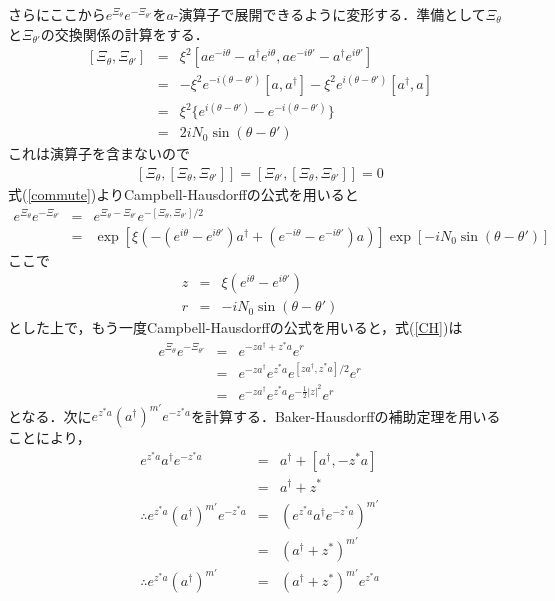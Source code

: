 \documentclass[10.5pt,a4paper]{jreport}
\begin{document}
さらにここから$e^{\Xi_\theta}e^{-\Xi_{\theta'} }$を$a$-演算子で展開できるように変形する．準備として$\Xi_\theta$と$\Xi_{\theta'}$の交換関係の計算をする．
\begin{eqnarray}
  \left[\Xi_\theta, \Xi_{\theta'}\right] &=& \xi^2\left[ae^{-i\theta} - a^\dagger e^{i\theta},ae^{-i\theta'}-a^\dagger e^{i\theta'}\right]\\
  &=&-\xi^2e^{-i(\theta-\theta')}[a,a^\dagger]-\xi^2e^{i(\theta-\theta')}[a^\dagger,a]\\
  &=&\xi^2\{e^{i(\theta-\theta')}-e^{-i(\theta-\theta')}\}\\
  &=&2iN_0\sin(\theta-\theta')
\end{eqnarray}
これは演算子を含まないので
\begin{eqnarray}
  \left[\Xi_\theta,[\Xi_\theta,\Xi_{\theta'}]\right] = \left[\Xi_{\theta'},[\Xi_\theta,\Xi_{\theta'}]\right] = 0\label{commute}
\end{eqnarray}
式(\ref{commute})よりCampbell-Hausdorffの公式を用いると
\begin{eqnarray}
  e^{\Xi_\theta}e^{-\Xi_{\theta'}} &=& e^{\Xi_\theta - \Xi_{\theta'}}e^{-[\Xi_\theta,\Xi_{\theta '}]/2}\\
  &=&\exp\left[\xi\left(-(e^{i\theta}- e^{i\theta'})a^\dagger + \left(e^{-i\theta}- e^{-i\theta'}\right)a\right)\right]
  \exp\left[-iN_0\sin(\theta-\theta') \right]\label{CH}
\end{eqnarray}
ここで
\begin{eqnarray}
  z &=& \xi(e^{i\theta}-e^{i\theta'})\\
  r &=& -iN_0\sin(\theta-\theta')
\end{eqnarray}
とした上で，もう一度Campbell-Hausdorffの公式を用いると，式(\ref{CH})は
\begin{eqnarray}
  e^{\Xi_\theta}e^{-\Xi_{\theta'}} &=& e^{-za^\dagger + z^*a}e^{r}\\
  &=&e^{-za^\dagger}e^{z^*a}e^{[za^\dagger,z^*a]/2}e^{r}\\
  &=&e^{-za^\dagger}e^{z^*a}e^{-\frac{1}{2}|z|^2}e^{r}\label{Xi}
\end{eqnarray}
となる．次に$e^{z^*a}(a^\dagger)^{m'} e^{-z^*a}$を計算する．Baker-Hausdorffの補助定理を用いることにより，
\begin{eqnarray}
  \nonumber e^{z^*a}a^\dagger e^{-z^*a} &=& a^\dagger + [a^\dagger,-z^*a]\\
  &=&a^\dagger + z^*\\
  \nonumber\therefore e^{z^*a}(a^\dagger)^{m'} e^{-z^*a} &=& (e^{z^*a}a^\dagger e^{-z^*a})^{m'}\\
  &=& (a^\dagger + z^*)^{m'}\\
  \therefore e^{z^*a}(a^\dagger)^{m'} &=& (a^\dagger + z^*)^{m'}e^{z^*a}\label{am}
\end{eqnarray}
\end{document}

